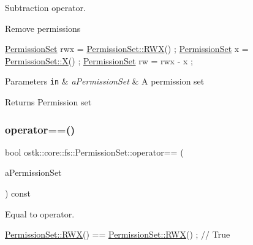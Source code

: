 Subtraction operator. 

Remove permissions


\begin{DoxyCode}
\hyperlink{classostk_1_1core_1_1fs_1_1_permission_set_a31c918014e874ceac487e92d0d3ac5a2}{PermissionSet} rwx = \hyperlink{classostk_1_1core_1_1fs_1_1_permission_set_a9298592527e35edb785430f03e83e79f}{PermissionSet::RWX}() ;
\hyperlink{classostk_1_1core_1_1fs_1_1_permission_set_a31c918014e874ceac487e92d0d3ac5a2}{PermissionSet} x = \hyperlink{classostk_1_1core_1_1fs_1_1_permission_set_ac84670d9520228b38bb8555b7f1e399f}{PermissionSet::X}() ;
\hyperlink{classostk_1_1core_1_1fs_1_1_permission_set_a31c918014e874ceac487e92d0d3ac5a2}{PermissionSet} rw = rwx - x ;
\end{DoxyCode}



\begin{DoxyParams}[1]{Parameters}
\mbox{\tt in}  & {\em a\+Permission\+Set} & A permission set \\
\hline
\end{DoxyParams}
\begin{DoxyReturn}{Returns}
Permission set 
\end{DoxyReturn}
\mbox{\label{classostk_1_1core_1_1fs_1_1_permission_set_a50c5f186390215e3ac21cb8a4988b279}} 
\subsubsection{\texorpdfstring{operator==()}{operator==()}}
{\footnotesize\ttfamily bool ostk\+::core\+::fs\+::\+Permission\+Set\+::operator== (\begin{DoxyParamCaption}\item[{const \hyperlink{classostk_1_1core_1_1fs_1_1_permission_set}{Permission\+Set} \&}]{a\+Permission\+Set }\end{DoxyParamCaption}) const}



Equal to operator. 


\begin{DoxyCode}
\hyperlink{classostk_1_1core_1_1fs_1_1_permission_set_a9298592527e35edb785430f03e83e79f}{PermissionSet::RWX}() == \hyperlink{classostk_1_1core_1_1fs_1_1_permission_set_a9298592527e35edb785430f03e83e79f}{PermissionSet::RWX}() ; \textcolor{comment}{// True}
\end{DoxyCode}



